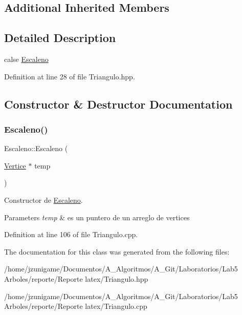 \subsection*{Additional Inherited Members}


\subsection{Detailed Description}
calse \hyperlink{class_escaleno}{Escaleno} 

Definition at line 28 of file Triangulo.\+hpp.



\subsection{Constructor \& Destructor Documentation}
\mbox{\label{class_escaleno_a2670875a1c4940661ea68fb97a8e2da1}} 
\subsubsection{\texorpdfstring{Escaleno()}{Escaleno()}}
{\footnotesize\ttfamily Escaleno\+::\+Escaleno (\begin{DoxyParamCaption}\item[{\hyperlink{class_vertice}{Vertice} $\ast$}]{temp }\end{DoxyParamCaption})}



Constructor de \hyperlink{class_escaleno}{Escaleno}. 


\begin{DoxyParams}{Parameters}
{\em temp} & es un puntero de un arreglo de vertices \\
\hline
\end{DoxyParams}


Definition at line 106 of file Triangulo.\+cpp.



The documentation for this class was generated from the following files\+:\begin{DoxyCompactItemize}
\item 
/home/jzunigame/\+Documentos/\+A\+\_\+\+Algoritmos/\+A\+\_\+\+Git/\+Laboratorios/\+Lab5 Arboles/reporte/\+Reporte latex/Triangulo.\+hpp\item 
/home/jzunigame/\+Documentos/\+A\+\_\+\+Algoritmos/\+A\+\_\+\+Git/\+Laboratorios/\+Lab5 Arboles/reporte/\+Reporte latex/Triangulo.\+cpp\end{DoxyCompactItemize}
